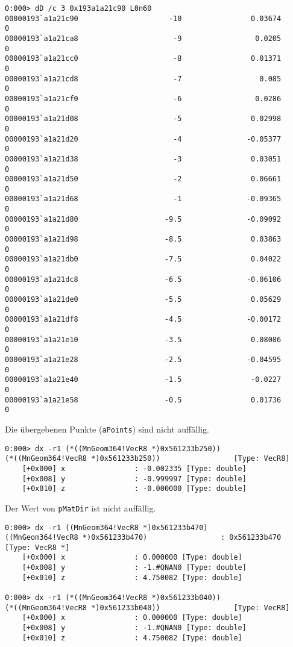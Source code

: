 \begin{lstlisting}
0:000> dD /c 3 0x193a1a21c90 L0n60
00000193`a1a21c90                     -10                0.03674                      0
00000193`a1a21ca8                      -9                 0.0205                      0
00000193`a1a21cc0                      -8                0.01371                      0
00000193`a1a21cd8                      -7                  0.085                      0
00000193`a1a21cf0                      -6                 0.0286                      0
00000193`a1a21d08                      -5                0.02998                      0
00000193`a1a21d20                      -4               -0.05377                      0
00000193`a1a21d38                      -3                0.03051                      0
00000193`a1a21d50                      -2                0.06661                      0
00000193`a1a21d68                      -1               -0.09365                      0
00000193`a1a21d80                    -9.5               -0.09092                      0
00000193`a1a21d98                    -8.5                0.03863                      0
00000193`a1a21db0                    -7.5                0.04022                      0
00000193`a1a21dc8                    -6.5               -0.06106                      0
00000193`a1a21de0                    -5.5                0.05629                      0
00000193`a1a21df8                    -4.5               -0.00172                      0
00000193`a1a21e10                    -3.5                0.08086                      0
00000193`a1a21e28                    -2.5               -0.04595                      0
00000193`a1a21e40                    -1.5                -0.0227                      0
00000193`a1a21e58                    -0.5                0.01736                      0
\end{lstlisting}

Die übergebenen Punkte (\verb|aPoints|) sind nicht auffällig.

\begin{lstlisting}
0:000> dx -r1 (*((MnGeom364!VecR8 *)0x561233b250))
(*((MnGeom364!VecR8 *)0x561233b250))                 [Type: VecR8]
    [+0x000] x                : -0.002335 [Type: double]
    [+0x008] y                : -0.999997 [Type: double]
    [+0x010] z                : -0.000000 [Type: double]
\end{lstlisting}

Der Wert von \verb|pMatDir| ist nicht auffällig.

\begin{lstlisting}
0:000> dx -r1 ((MnGeom364!VecR8 *)0x561233b470)
((MnGeom364!VecR8 *)0x561233b470)                 : 0x561233b470 [Type: VecR8 *]
    [+0x000] x                : 0.000000 [Type: double]
    [+0x008] y                : -1.#QNAN0 [Type: double]
    [+0x010] z                : 4.750082 [Type: double]

0:000> dx -r1 (*((MnGeom364!VecR8 *)0x561233b040))
(*((MnGeom364!VecR8 *)0x561233b040))                 [Type: VecR8]
    [+0x000] x                : 0.000000 [Type: double]
    [+0x008] y                : -1.#QNAN0 [Type: double]
    [+0x010] z                : 4.750082 [Type: double]
\end{lstlisting}


